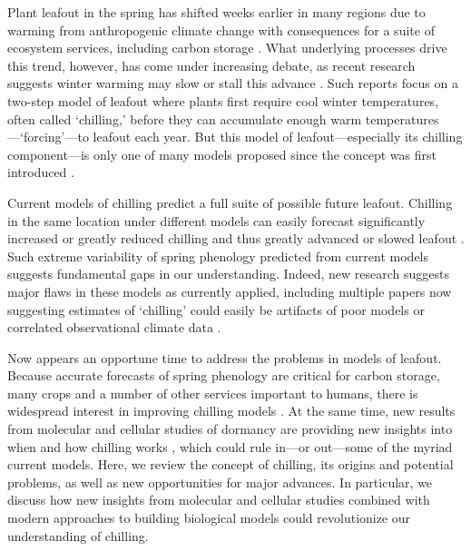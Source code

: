\documentclass[11pt]{article}
\begin{document}
Plant leafout in the spring has shifted weeks earlier in many regions due to warming from anthropogenic climate change with consequences for a suite of ecosystem services, including carbon storage \citep{keenan2014net,ipcc2022}.  What underlying processes drive this trend, however, has come under increasing debate, as recent research suggests winter warming may slow or stall this advance \citep{fu2015,piao2017}. Such reports focus on a two-step model of leafout where plants first require cool winter temperatures, often called `chilling,' before they can accumulate enough warm temperatures---`forcing'---to leafout each year. But this model of leafout---especially its chilling component---is only one of many models proposed since the concept was first introduced \citep[at least 30 models are used today, see][]{basler2016evaluating,hufkens2018integrated}. 

Current models of chilling predict a full suite of possible future leafout. Chilling in the same location under different models can easily forecast significantly increased or greatly reduced chilling and thus greatly advanced or slowed leafout \citep{guy2014,chuine2016}. Such extreme variability of spring phenology predicted from current models suggests fundamental gaps in our understanding. Indeed, new research suggests major flaws in these models as currently applied, including multiple papers now suggesting estimates of `chilling' could easily be artifacts of poor models or correlated observational climate data \citep{decsens,gao2024}. 

Now appears an opportune time to address the problems in models of leafout. Because accurate forecasts of spring phenology are critical for carbon storage, many crops and a number of other services important to humans, there is widespread interest in improving chilling models \citep{Luedeling2015Acta,chuine2016}. At the same time, new results from molecular and cellular studies of dormancy are providing new insights into when and how chilling works \citep{pan2023epigenetic,zhu2021cold}, which could rule in---or out---some of the myriad current models. 
Here, we review the concept of chilling, its origins and potential problems, as well as new opportunities for major advances. In particular, we discuss how new insights from molecular and cellular studies combined with modern approaches to building biological models could revolutionize our understanding of chilling. 
\end{document}
